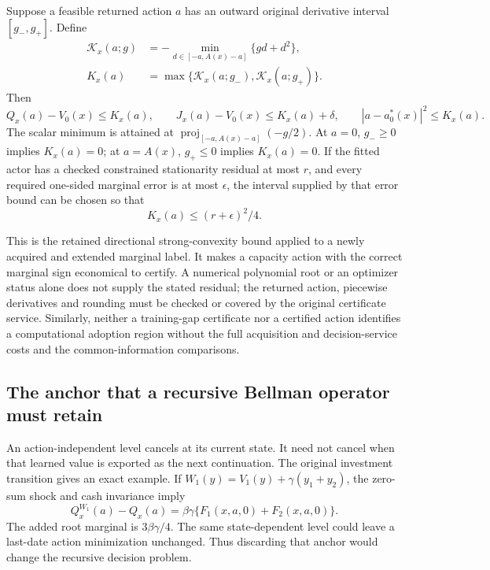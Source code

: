 \begin{proposition}
\label{prop:marginalpolicy121}
Suppose a feasible returned action \(a\) has an outward original
derivative interval \([g_-,g_+]\).  Define
\begin{align}
 \mathcal K_x(a;g)&=
   -\min_{d\in[-a,A(x)-a]}\{gd+d^2\},\nonumber\\
 K_x(a)&=\max\{\mathcal K_x(a;g_-),
                         \mathcal K_x(a;g_+)\}.
 \label{eq:marginalkkt121}
\end{align}
Then
\[
 Q_x(a)-V_0(x)\leq K_x(a),\qquad
 J_x(a)-V_0(x)\leq K_x(a)+\delta,\qquad
 |a-a_0^*(x)|^2\leq K_x(a).
\]
The scalar minimum is attained at
\(\operatorname{proj}_{[-a,A(x)-a]}(-g/2)\).
At \(a=0\), \(g_-\geq0\) implies \(K_x(a)=0\);
at \(a=A(x)\), \(g_+\leq0\) implies \(K_x(a)=0\).
If the fitted actor has a checked constrained stationarity
residual at most \(r\), and every required one-sided marginal
error is at most \(\epsilon\), the interval supplied by that
error bound can be chosen so that
\[
 K_x(a)\leq (r+\epsilon)^2/4.
\]
\end{proposition}

This is the retained directional strong-convexity bound applied
to a newly acquired and extended marginal label.  It makes a
capacity action with the correct marginal sign economical to
certify.  A numerical polynomial root or an optimizer status
alone does not supply the stated residual; the returned action,
piecewise derivatives and rounding must be checked or covered
by the original certificate service.  Similarly, neither a
training-gap certificate nor a certified action identifies a
computational adoption region without the full acquisition and
decision-service costs and the common-information comparisons.

\subsection{The anchor that a recursive Bellman operator must retain}

An action-independent level cancels at its current state.
It need not cancel when that learned value is exported as
the next continuation.  The original investment transition
gives an exact example.  If
\(W_1(y)=V_1(y)+\gamma(y_1+y_2)\), the zero-sum shock and
cash invariance imply
\[
 Q_x^{W_1}(a)-Q_x(a)
    =\beta\gamma\{F_1(x,a,0)+F_2(x,a,0)\}.
\]
The added root marginal is \(3\beta\gamma/4\).
The same state-dependent level could leave a last-date
action minimization unchanged.  Thus discarding that
anchor would change the recursive decision problem.

